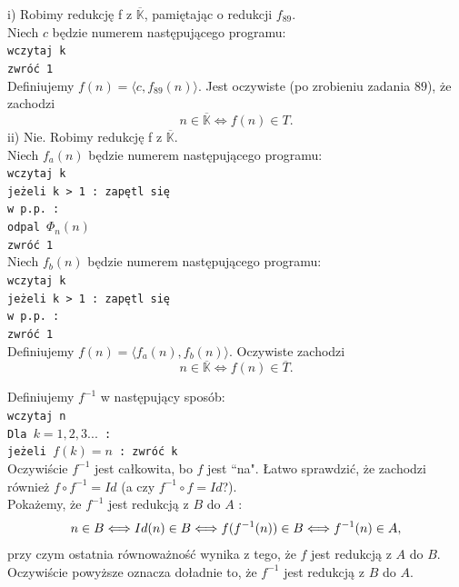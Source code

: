 \documentclass[a4paper,11pt]{article}
\newenvironment{zadanie}[1]
  {\renewcommand\theinnercustomthm{#1}\innercustomthm}
  {\endinnercustomthm}
\begin{document}
\begin{zadanie}{99}
\end{zadanie}
i) Robimy redukcję f z $\overline{\mathbb{K}}$, pamiętając o redukcji $f_{89}$. \\
Niech $c$ będzie numerem następującego programu: \\
\texttt{wczytaj k  \\ zwróć 1 \\}
Definiujemy $f(n) = \langle c , f_{89}(n) \rangle$. Jest oczywiste (po zrobieniu zadania $89$), że zachodzi \\
$$
n \in \overline{\mathbb{K}} \Longleftrightarrow f(n) \in T.
$$
ii) Nie. Robimy redukcję f z $\overline{\mathbb{K}}$. \\
Niech $f_a(n)$ będzie numerem następującego programu: \\
\texttt{wczytaj k \\ jeżeli k > 1 : zapętl się  \\ w p.p. : \\ odpal $\Phi_n(n)$ \\ zwróć 1 \\}
Niech $f_b(n)$ będzie numerem następującego programu: \\
\texttt{wczytaj k \\ jeżeli k > 1 : zapętl się  \\ w p.p. : \\ zwróć 1 \\}
Definiujemy $f(n) = \langle f_a(n) , f_b(n) \rangle$. Oczywiste zachodzi \\
$$
n \in \overline{\mathbb{K}} \Longleftrightarrow f(n) \in \overline{T}.
$$

\begin{zadanie}{101}
\end{zadanie}
Definiujemy $f^{-1}$ w następujący sposób: \\
\texttt{wczytaj n \\ Dla $k=1,2,3...$ : \\ jeżeli $f(k) = n$ : zwróć k \\ }
Oczywiście $f^{-1}$ jest całkowita, bo $f$ jest ``na". Łatwo sprawdzić, że zachodzi również $f \circ f^{-1} = Id$ 
(a czy $f^{-1} \circ f = Id$?). \\
Pokażemy, że $f^{-1}$ jest redukcją z $B$ do $A$ :
\begin{align}
 n \in B \Longleftrightarrow Id(n) \in B \Longleftrightarrow f(f^{-1}(n)) \in B \Longleftrightarrow f^{-1}(n) \in A, \notag 
\end{align}
przy czym ostatnia równoważność wynika z tego, że $f$ jest redukcją z $A$ do $B$. Oczywiście powyższe oznacza doładnie to,
że $f^{-1}$ jest redukcją z $B$ do $A$.
\end{document}
